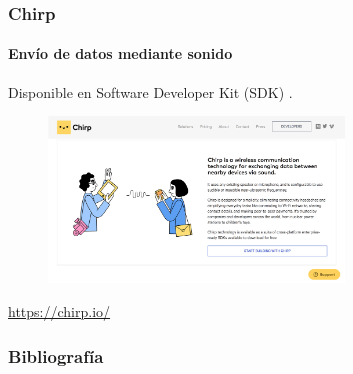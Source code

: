 \documentclass[xcolor=table]{beamer}
\begin{document}
	\begin{frame}
		\frametitle{Chirp}
		\framesubtitle{Envío de datos mediante sonido}
		Disponible en Software Developer Kit (SDK) .
		\begin{figure}[h]
    			\centering
    			\includegraphics[width=0.7\textwidth]{images/chirp}
    			\label{fig:8}
    		\end{figure}
		\url{https://chirp.io/}
	\end{frame}
    	\begin{frame}%
        	\frametitle{Bibliografía}
        	{\footnotesize
        		
        		
        	}
        \end{frame}
\end{document}
